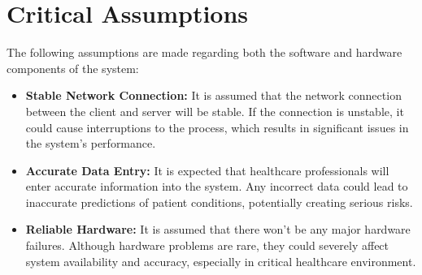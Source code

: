 \documentclass{article}
\begin{document}
\section{Critical Assumptions}


The following assumptions are made regarding both the software and hardware components of the system:

\begin{itemize}
    \item \textbf{Stable Network Connection:} It is assumed that the network connection between the client and server will be stable. If the connection is unstable, it could cause interruptions to the process, which results in significant issues in the system’s performance.
    
    \item \textbf{Accurate Data Entry:} It is expected that healthcare professionals will enter accurate information into the system. Any incorrect data could lead to inaccurate predictions of patient conditions, potentially creating serious risks.
    
    \item \textbf{Reliable Hardware:} It is assumed that there won’t be any major hardware failures. Although hardware problems are rare, they could severely affect system availability and accuracy, especially in critical healthcare environment.
    
\end{itemize}
\end{document}
